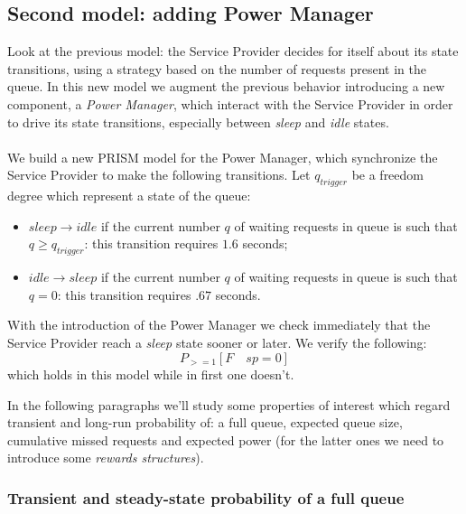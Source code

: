 \subsection{Second model: adding Power Manager}

Look at the previous model: the Service Provider decides for itself
about its state transitions, using a strategy based on the number of
requests present in the queue. In this new model we augment the
previous behavior introducing a new component, a \emph{Power Manager},
which interact with the Service Provider in order to drive its state
transitions, especially between \emph{sleep} and \emph{idle} states.
\\\\
We build a new PRISM model for the Power Manager, which synchronize
the Service Provider to make the following transitions. Let
$q_{trigger}$ be a freedom degree which represent a state of the
queue:
\begin{itemize}
\item $sleep \rightarrow idle$ if the current number $q$ of waiting
  requests in queue is such that $q \geq q_{trigger}$: this transition
  requires $1.6$ seconds;
\item $idle \rightarrow sleep$ if the current number $q$ of waiting
  requests in queue is such that $q = 0$: this transition requires
  $.67$ seconds.
\end{itemize}
With the introduction of the Power Manager we check immediately that
the Service Provider reach a \emph{sleep} state sooner or later. We
verify the following:
\begin{displaymath}
  P_{>=1} [ F\quad sp=0 ]
\end{displaymath}
which holds in this model while in first one doesn't.

In the following paragraphs we'll study some properties of interest
which regard transient and long-run probability of: a full queue,
expected queue size, cumulative missed requests and expected power (for
the latter ones we need to introduce some \emph{rewards structures}).

\subsubsection{Transient and steady-state probability of a full queue}

